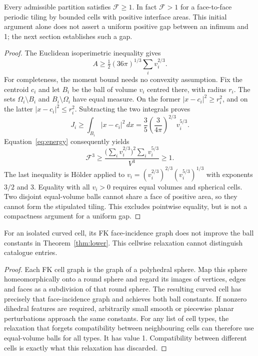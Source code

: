 \documentclass[11pt,a4paper]{report}
\newcommand{\DF}{\mathcal F}
\begin{document}
\begin{theorem}\label{thm:lower}
Every admissible partition satisfies $\DF\geq1$. In fact $\DF>1$ for a
face-to-face periodic tiling by bounded cells with positive interface areas.
This initial argument alone does not assert a uniform positive gap
between an infimum and 1; the next section establishes such a gap.
\end{theorem}
\begin{proof}
The Euclidean isoperimetric inequality gives
\[
 A\geq\tfrac12(36\pi)^{1/3}\sum_i v_i^{2/3}.
\]
For completeness, the moment bound needs no convexity assumption. Fix the
centroid $c_i$ and let $B_i$ be the ball of volume $v_i$ centred there, with
radius $r_i$. The sets $\Omega_i\setminus B_i$ and $B_i\setminus\Omega_i$
have equal measure. On the former $|x-c_i|^2\geq r_i^2$, and on the latter
$|x-c_i|^2\leq r_i^2$. Subtracting the two integrals proves
\[
 J_i\geq\int_{B_i}|x-c_i|^2\,dx
       =\frac35\left(\frac3{4\pi}\right)^{2/3}v_i^{5/3}.
\]
Equation~\eqref{eq:energy} consequently yields
\[
 \DF^3\geq
 \frac{\bigl(\sum_i v_i^{2/3}\bigr)^2\sum_i v_i^{5/3}}{V^3}\geq1.
\]
The last inequality is Hölder applied to
$v_i=(v_i^{2/3})^{2/3}(v_i^{5/3})^{1/3}$ with exponents $3/2$ and 3.
Equality with all $v_i>0$ requires equal volumes and spherical cells.
Two disjoint equal-volume balls cannot share a face of positive area, so
they cannot form the stipulated tiling. This excludes pointwise equality,
but is not a compactness argument for a uniform gap.
\end{proof}

\begin{proposition}\label{prop:cellwise}
For an isolated curved cell, its FK face-incidence graph does not improve
the ball constants in Theorem~\ref{thm:lower}. This cellwise relaxation
cannot distinguish catalogue entries.
\end{proposition}
\begin{proof}
Each FK cell graph is the graph of a polyhedral sphere. Map this sphere
homeomorphically onto a round sphere and regard its images of vertices,
edges and faces as a subdivision of that round sphere. The resulting curved
cell has precisely that face-incidence graph and achieves both ball
constants. If nonzero dihedral features are required, arbitrarily small
smooth or piecewise planar perturbations approach the same constants.
For any list of cell types, the relaxation that forgets compatibility
between neighbouring cells can therefore use equal-volume balls for all
types. It has value 1. Compatibility between different cells is exactly
what this relaxation has discarded.
\end{proof}
\end{document}
